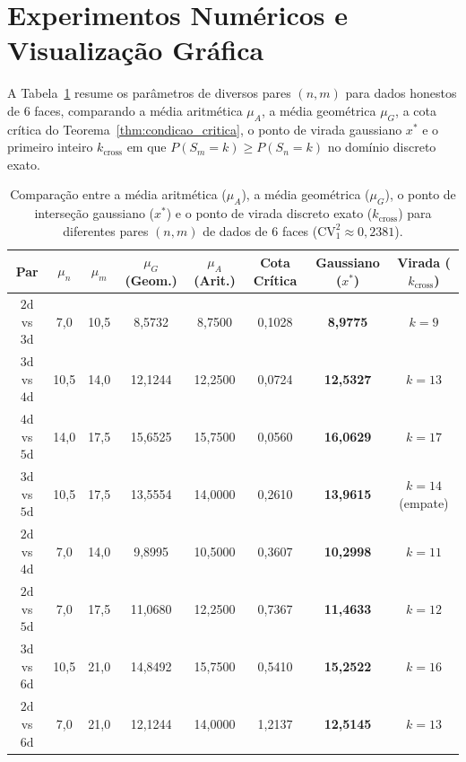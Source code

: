 \documentclass[11pt,a4paper]{article}
\theoremstyle{definition}
\theoremstyle{remark}
\begin{document}
\section{Experimentos Numéricos e Visualização Gráfica}

A Tabela~\ref{tab:comparacao_modelos} resume os parâmetros de diversos pares $(n,m)$ para dados honestos de $6$ faces, comparando a média aritmética $\mu_A$, a média geométrica $\mu_G$, a cota crítica do Teorema~\ref{thm:condicao_critica}, o ponto de virada gaussiano $x^*$ e o primeiro inteiro $k_{\text{cross}}$ em que $P(S_m = k) \ge P(S_n = k)$ no domínio discreto exato.

\begin{table}[H]
\centering
\caption{Comparação entre a média aritmética ($\mu_A$), a média geométrica ($\mu_G$), o ponto de interseção gaussiano ($x^*$) e o ponto de virada discreto exato ($k_{\text{cross}}$) para diferentes pares $(n,m)$ de dados de $6$ faces ($\mathrm{CV}_1^2 \approx 0{,}2381$).}
\label{tab:comparacao_modelos}
\vspace{0.3em}
\footnotesize
\setlength{\tabcolsep}{4.5pt}
\begin{tabular}{@{}cccccccc@{}}
\toprule
\textbf{Par} & \textbf{$\mu_n$} & \textbf{$\mu_m$} & \textbf{$\mu_G$ (Geom.)} & \textbf{$\mu_A$ (Arit.)} & \textbf{Cota Crítica} & \textbf{Gaussiano ($x^*$)} & \textbf{Virada ($k_{\text{cross}}$)} \\
\midrule
$2\text{d}$ vs $3\text{d}$ &  7,0 & 10,5 &  8,5732 &  8,7500 & 0,1028 & \textbf{8,9775}  & $k = 9$  \\
$3\text{d}$ vs $4\text{d}$ & 10,5 & 14,0 & 12,1244 & 12,2500 & 0,0724 & \textbf{12,5327} & $k = 13$ \\
$4\text{d}$ vs $5\text{d}$ & 14,0 & 17,5 & 15,6525 & 15,7500 & 0,0560 & \textbf{16,0629} & $k = 17$ \\
$3\text{d}$ vs $5\text{d}$ & 10,5 & 17,5 & 13,5554 & 14,0000 & 0,2610 & \textbf{13,9615} & $k = 14$ (empate) \\
$2\text{d}$ vs $4\text{d}$ &  7,0 & 14,0 &  9,8995 & 10,5000 & 0,3607 & \textbf{10,2998} & $k = 11$ \\
$2\text{d}$ vs $5\text{d}$ &  7,0 & 17,5 & 11,0680 & 12,2500 & 0,7367 & \textbf{11,4633} & $k = 12$ \\
$3\text{d}$ vs $6\text{d}$ & 10,5 & 21,0 & 14,8492 & 15,7500 & 0,5410 & \textbf{15,2522} & $k = 16$ \\
$2\text{d}$ vs $6\text{d}$ &  7,0 & 21,0 & 12,1244 & 14,0000 & 1,2137 & \textbf{12,5145} & $k = 13$ \\
\bottomrule
\end{tabular}
\end{table}
\end{document}
